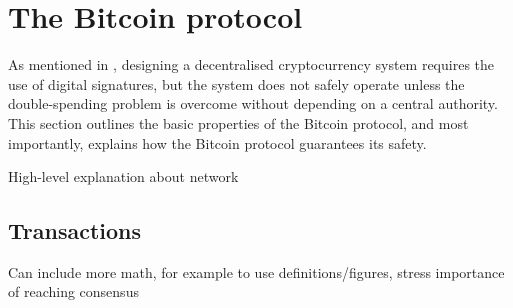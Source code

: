 \section{The Bitcoin protocol}

As mentioned in \cite{Nakamoto2008Bitcoin}, designing a decentralised cryptocurrency system requires the use of digital signatures, but the system does not safely operate unless the double-spending problem is overcome without depending on a central authority. This section outlines the basic properties of the Bitcoin protocol, and most importantly, explains how the Bitcoin protocol guarantees its safety.

\bigbreak

High-level explanation about network

\subsection{Transactions}

Can include more math, for example to use definitions/figures, stress importance of reaching consensus

\bigbreak

